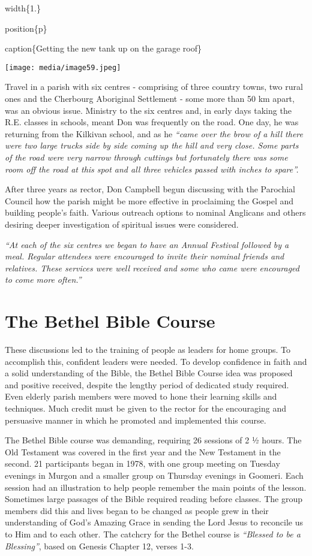 width\{1.\}

position\{p\}

caption\{Getting the new tank up on the garage roof\}

\texttt{[image: media/image59.jpeg]}

Travel in a parish with six centres - comprising of three country towns, two rural ones and the Cherbourg Aboriginal Settlement - some more than 50 km apart, was an obvious issue. Ministry to the six centres and, in early days taking the R.E. classes in schools, meant Don was frequently on the road. One day, he was returning from the Kilkivan school, and as he \emph{``came over the brow of a hill there were two large trucks side by side coming up the hill and very close. Some parts of the road were very narrow through cuttings but fortunately there was some room off the road at this spot and all three vehicles passed with inches to spare''.}

After three years as rector, Don Campbell begun discussing with the Parochial Council how the parish might be more effective in proclaiming the Gospel and building people's faith. Various outreach options to nominal Anglicans and others desiring deeper investigation of spiritual issues were considered.

\emph{``At each of the six centres we began to have an Annual Festival followed by a meal. Regular attendees were encouraged to invite their nominal friends and relatives. These services were well received and some who came were encouraged to come more often.''}

\hypertarget{the-bethel-bible-course}{%
\section{The Bethel Bible Course}\label{the-bethel-bible-course}}

These discussions led to the training of people as leaders for home groups. To accomplish this, confident leaders were needed. To develop confidence in faith and a solid understanding of the Bible, the Bethel Bible Course idea was proposed and positive received, despite the lengthy period of dedicated study required. Even elderly parish members were moved to hone their learning skills and techniques. Much credit must be given to the rector for the encouraging and persuasive manner in which he promoted and implemented this course.

The Bethel Bible course was demanding, requiring 26 sessions of 2 ½ hours. The Old Testament was covered in the first year and the New Testament in the second. 21 participants began in 1978, with one group meeting on Tuesday evenings in Murgon and a smaller group on Thursday evenings in Goomeri. Each session had an illustration to help people remember the main points of the lesson. Sometimes large passages of the Bible required reading before classes. The group members did this and lives began to be changed as people grew in their understanding of God's Amazing Grace in sending the Lord Jesus to reconcile us to Him and to each other. The catchcry for the Bethel course is \emph{``Blessed to be a Blessing''}, based on Genesis Chapter 12, verses 1-3.

